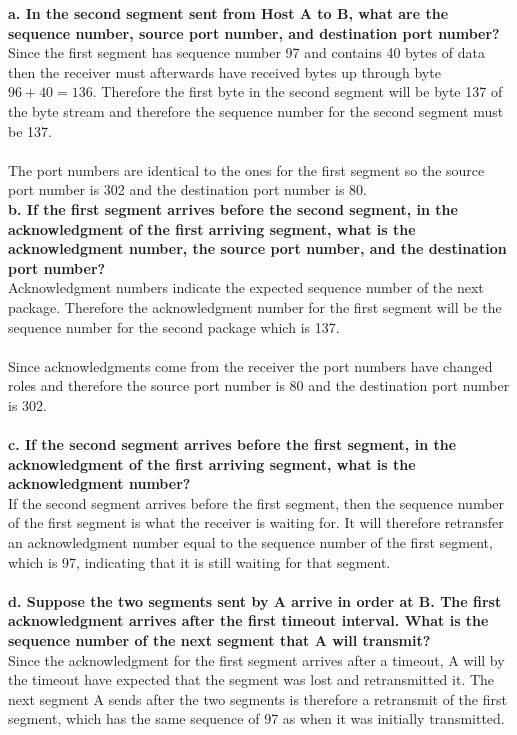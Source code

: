 \textbf{a. In the second segment sent from Host A to B, what are the sequence number, source port number, and destination port number?} \\
Since the first segment has sequence number 97 and contains 40 bytes of data then the receiver must afterwards have received bytes up through byte $96 + 40 = 136$. Therefore the first byte in the second segment will be byte 137 of the byte stream and therefore the sequence number for the second segment must be 137. \\
\\
The port numbers are identical to the ones for the first segment so the source port number is 302 and the destination port number is 80.
\\
\textbf{b. If the first segment arrives before the second segment, in the acknowledgment of the first arriving segment, what is the acknowledgment number, the source port number, and the destination port number?} \\
Acknowledgment numbers indicate the expected sequence number of the next package. Therefore the acknowledgment number for the first segment will be the sequence number for the second package which is 137.\\
\\
Since acknowledgments come from the receiver the port numbers have changed roles and therefore the source port number is 80 and the destination port number is 302. \\
\\
\textbf{c. If the second segment arrives before the first segment, in the acknowledgment of the first arriving segment, what is the acknowledgment number?} \\
If the second segment arrives before the first segment, then the sequence number of the first segment is what the receiver is waiting for. It will therefore retransfer an acknowledgment number equal to the sequence number of the first segment, which is 97, indicating that it is still waiting for that segment. \\
\\
\textbf{d. Suppose the two segments sent by A arrive in order at B. The first acknowledgment arrives after the first timeout interval. What is the sequence number of the next segment that A will transmit?} \\
Since the acknowledgment for the first segment arrives after a timeout, A will by the timeout have expected that the segment was lost and retransmitted it. The next segment A sends after the two segments is therefore a retransmit of the first segment, which has the same sequence of 97 as when it was initially transmitted.



